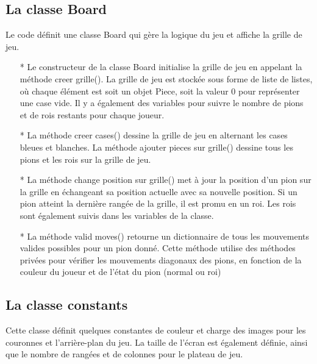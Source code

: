 \documentclass[12pt]{article}
\begin{document}
	\subsection{La classe Board}
	 Le code définit une classe Board qui gère la logique du jeu et affiche la grille de jeu.\\
	 \begin{itemize}
	 	\item[* ] Le constructeur de la classe Board initialise la grille de jeu en appelant la méthode creer grille(). La grille de jeu est stockée sous forme de liste de listes, où chaque élément est soit un objet Piece, soit la valeur 0 pour représenter une case vide. Il y a également des variables pour suivre le nombre de pions et de rois restants pour chaque joueur. 
	 	\item[* ] La méthode creer cases() dessine la grille de jeu en alternant les cases bleues et blanches. La méthode ajouter pieces sur grille() dessine tous les pions et les rois sur la grille de jeu.
	 	\item[* ]  La méthode change position sur grille() met à jour la position d'un pion sur la grille en échangeant sa position actuelle avec sa nouvelle position. Si un pion atteint la dernière rangée de la grille, il est promu en un roi. Les rois sont également suivis dans les variables de la classe.
	 	\item[* ] La méthode valid moves() retourne un dictionnaire de tous les mouvements valides possibles pour un pion donné. Cette méthode utilise des méthodes privées pour vérifier les mouvements diagonaux des pions, en fonction de la couleur du joueur et de l'état du pion (normal ou roi)
	 \end{itemize}
	 
	 
	 \subsection{La classe constants}
	 Cette classe définit quelques constantes de couleur et charge des images pour les couronnes et l'arrière-plan du jeu. La taille de l'écran est également définie, ainsi que le nombre de rangées et de colonnes pour le plateau de jeu.
\end{document}
